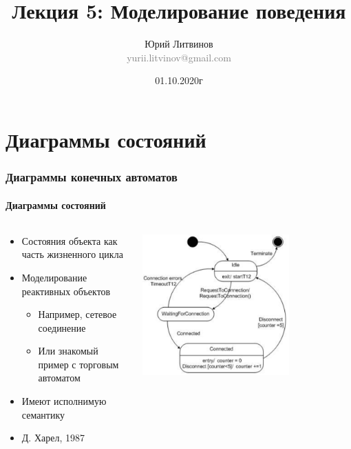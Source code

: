 \documentclass[xetex,mathserif,serif]{beamer}
\title[Моделирование поведения]{Лекция 5: Моделирование поведения}
\author[Юрий Литвинов]{Юрий Литвинов\\\small{\textcolor{gray}{yurii.litvinov@gmail.com}}}
\date{01.10.2020г}
\begin{document}
	\frame{\titlepage}

	\section{Диаграммы состояний}

	\begin{frame}
		\frametitle{Диаграммы конечных автоматов}
		\framesubtitle{Диаграммы состояний}
		\begin{columns}
			\begin{column}{0.5\textwidth}
				\begin{itemize}
					\item Состояния объекта как часть жизненного цикла
					\item Моделирование реактивных объектов
					\begin{itemize}
						\item Например, сетевое соединение
						\item Или знакомый пример с торговым автоматом
					\end{itemize}
					\item Имеют исполнимую семантику
					\item Д. Харел, 1987
				\end{itemize}
			\end{column}
			\begin{column}{0.5\textwidth}
				\begin{center}
					\includegraphics[width=0.7\textwidth]{stateTransitionExample.png}
				\end{center}
			\end{column}
		\end{columns}
	\end{frame}
\end{document}
